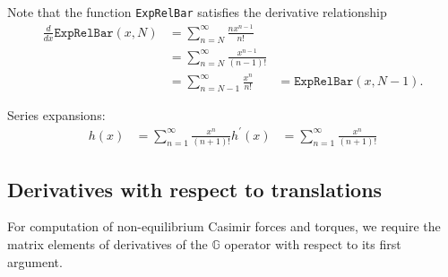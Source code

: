 \documentclass[letterpaper]{article}
\begin{document}
Note that the function \texttt{ExpRelBar} satisfies the 
derivative relationship
\begin{align*}
 \frac{d}{dx} \texttt{ExpRelBar}(x,N)
&= \sum_{n=N}^\infty \frac{n x^{n-1}}{n!} \\
&= \sum_{n=N}^\infty \frac{x^{n-1}}{(n-1)!} \\
&= \sum_{n=N-1}^\infty \frac{x^{n}}{n!}
&= \texttt{ExpRelBar}(x,N-1).
\end{align*}

Series expansions:
\begin{align*}
  h(x)        &= \sum_{n=1}^\infty \frac{x^n}{(n+1)!}   
  h^\prime(x) &= \sum_{n=1}^\infty \frac{x^n}{(n+1)!}   
\end{align*}

\subsection{Derivatives with respect to translations}

For computation of non-equilibrium Casimir forces and torques,
we require the matrix elements of derivatives of the
$\mathbb{G}$ operator with respect to its first argument.
\end{document}
